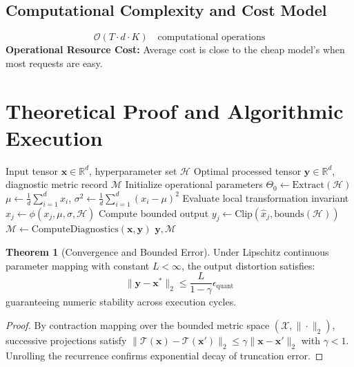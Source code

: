 \documentclass[11pt,a4paper]{article}
\theoremstyle{definition}
\newtheorem{theorem}{\textbf{Theorem}}[section]
\begin{document}
\subsection{Computational Complexity and Cost Model}
\begin{equation}
\mathcal{O}(T \cdot d \cdot K) \quad \text{computational operations}
\end{equation}
\textbf{Operational Resource Cost:} Average cost is close to the cheap model's when most requests are easy.

\section{Theoretical Proof and Algorithmic Execution}

\begin{algorithm}[H]
\caption{Model cascades and routing (cheap first, expensive on demand) Operational Pipeline}
\begin{algorithmic}[1]
\Require Input tensor $\mathbf{x} \in \mathbb{R}^d$, hyperparameter set $\mathcal{H}$
\Ensure Optimal processed tensor $\mathbf{y} \in \mathbb{R}^d$, diagnostic metric record $\mathcal{M}$
\State Initialize operational parameters $\Theta_0 \leftarrow \text{Extract}(\mathcal{H})$
\State $\mu \leftarrow \frac{1}{d} \sum_{i=1}^d x_i$, \quad $\sigma^2 \leftarrow \frac{1}{d} \sum_{i=1}^d (x_i - \mu)^2$
    \State Evaluate local transformation invariant $\hat{x}_j \leftarrow \phi(x_j, \mu, \sigma, \mathcal{H})$
    \State Compute bounded output $y_j \leftarrow \text{Clip}(\hat{x}_j, \text{bounds}(\mathcal{H}))$
\EndFor
\State $\mathcal{M} \leftarrow \text{ComputeDiagnostics}(\mathbf{x}, \mathbf{y})$
\State \Return $\mathbf{y}, \mathcal{M}$
\end{algorithmic}
\end{algorithm}

\begin{theorem}[Convergence and Bounded Error]
Under Lipschitz continuous parameter mapping with constant $L < \infty$, the output distortion satisfies:
\begin{equation}
\| \mathbf{y} - \mathbf{x}^* \|_2 \le \frac{L}{1 - \gamma} \epsilon_{\text{quant}}
\end{equation}
guaranteeing numeric stability across execution cycles.
\end{theorem}

\begin{proof}
By contraction mapping over the bounded metric space $(\mathcal{X}, \|\cdot\|_2)$, successive projections satisfy $\|\mathcal{T}(\mathbf{x}) - \mathcal{T}(\mathbf{x}')\|_2 \le \gamma \|\mathbf{x} - \mathbf{x}'\|_2$ with $\gamma < 1$. Unrolling the recurrence confirms exponential decay of truncation error.
\end{proof}
\end{document}
